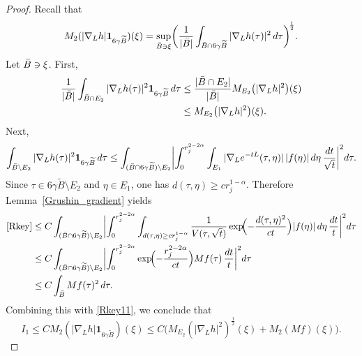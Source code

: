 \documentclass[12pt]{amsart}
\begin{document}
\begin{proof}
Recall that
\begin{equation*}
    M_2(|\nabla_L h|\mathbf{1}_{6\gamma \widetilde{B}})(\xi) = \sup_{\Bar{B} \ni \xi} \biggl( \frac{1}{|\Bar{B}|} \int_{\Bar{B} \cap 6\gamma \widetilde{B}}  |\nabla_L h(\tau)|^2 \, d\tau \biggr)^{\!\frac{1}{2}}.
\end{equation*}
Let $\Bar{B}\ni \xi$. First,
\begin{align}\label{Rkey11}
    \frac{1}{|\Bar{B}|}\int_{\Bar{B}\cap E_2} |\nabla_L h(\tau)|^2 \mathbf{1}_{6\gamma \widetilde{B}} \, d\tau
    &\le  \frac{|\Bar{B}\cap E_2|}{|\Bar{B}|} M_{E_2}\bigl(|\nabla_Lh|^2\bigr)(\xi)\nonumber\\
    &\le M_{E_2}\bigl(|\nabla_Lh|^2\bigr)(\xi).
\end{align}
Next,
\begin{align}\label{Rkey}
    \int_{\Bar{B} \setminus E_2} |\nabla_L h(\tau)|^2 \mathbf{1}_{6\gamma \widetilde{B}} \, d\tau
    \le \int_{(\Bar{B} \cap 6\gamma \widetilde{B}) \setminus E_2} \biggl| \int_0^{r_j^{2-2\alpha}} \int_{E_1} |\nabla_L e^{-tL}(\tau, \eta)| \, |f(\eta)| \, d\eta \, \frac{dt}{\sqrt{t}} \biggr|^2 d\tau.
\end{align}
Since $\tau \in 6 \gamma \widetilde{B} \setminus E_2$ and $\eta \in E_1$, one has $d(\tau,\eta)\ge c r_j^{1-\alpha}$. Therefore Lemma~\ref{Grushin_gradient} yields
\begin{align*}
    \eqref{Rkey}
    &\le C \int_{(\Bar{B} \cap 6\gamma \widetilde{B}) \setminus E_2} \biggl| \int_0^{r_j^{2-2\alpha}} \int_{d(\tau,\eta)\ge c r_j^{1-\alpha}} \frac{1}{V(\tau,\sqrt{t})} \exp\!\Bigl(-\frac{d(\tau,\eta)^2}{c t}\Bigr) |f(\eta)| \, d\eta \, \frac{dt}{t} \biggr|^2 d\tau\\
    &\le C \int_{(\Bar{B} \cap 6\gamma \widetilde{B}) \setminus E_2} \biggl| \int_0^{r_j^{2-2\alpha}} \exp\!\Bigl(-\frac{r_j^{2-2\alpha}}{c t}\Bigr) Mf(\tau) \, \frac{dt}{t} \biggr|^2 d\tau\\
    &\le C \int_{\Bar{B}} Mf(\tau)^2 \, d\tau.
\end{align*}
Combining this with \eqref{Rkey11}, we conclude that
\begin{equation}\label{est_I1}
    I_1\le C M_2(|\nabla_L h|\mathbf{1}_{6\gamma \widetilde{B}})(\xi) \le C \bigl( M_{E_2}(|\nabla_L h|^2)^{\frac{1}{2}}(\xi) +  M_2( Mf )(\xi) \bigr).
\end{equation}


\end{proof}
\end{document}

